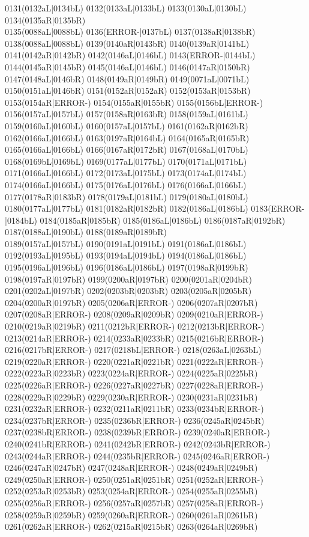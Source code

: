 0131(0132aL|0134bL) 0132(0133aL|0133bL) 0133(0130aL|0130bL) 0134(0135aR|0135bR) \\0135(0088aL|0088bL) 0136(ERROR-|0137bL) 0137(0138aR|0138bR) 0138(0088aL|0088bL) 0139(0140aR|0143bR) 0140(0139aR|0141bL) 0141(0142aR|0142bR) 0142(0146aL|0146bL) 0143(ERROR-|0144bL) \\0144(0145aR|0145bR) 0145(0146aL|0146bL) 0146(0147aR|0150bR) 0147(0148aL|0146bR) 0148(0149aR|0149bR) 0149(0071aL|0071bL) 0150(0151aL|0146bR) 0151(0152aR|0152aR) 0152(0153aR|0153bR) \\0153(0154aR|ERROR-) 0154(0155aR|0155bR) 0155(0156bL|ERROR-) 0156(0157aL|0157bL) 0157(0158aR|0163bR) 0158(0159aL|0161bL) 0159(0160aL|0160bL) 0160(0157aL|0157bL) 0161(0162aR|0162bR) \\0162(0166aL|0166bL) 0163(0197aR|0164bL) 0164(0165aR|0165bR) 0165(0166aL|0166bL) 0166(0167aR|0172bR) 0167(0168aL|0170bL) 0168(0169bL|0169bL) 0169(0177aL|0177bL) 0170(0171aL|0171bL) \\0171(0166aL|0166bL) 0172(0173aL|0175bL) 0173(0174aL|0174bL) 0174(0166aL|0166bL) 0175(0176aL|0176bL) 0176(0166aL|0166bL) 0177(0178aR|0183bR) 0178(0179aL|0181bL) 0179(0180aL|0180bL) \\0180(0177aL|0177bL) 0181(0182aR|0182bR) 0182(0186aL|0186bL) 0183(ERROR-|0184bL) 0184(0185aR|0185bR) 0185(0186aL|0186bL) 0186(0187aR|0192bR) 0187(0188aL|0190bL) 0188(0189aR|0189bR) \\0189(0157aL|0157bL) 0190(0191aL|0191bL) 0191(0186aL|0186bL) 0192(0193aL|0195bL) 0193(0194aL|0194bL) 0194(0186aL|0186bL) 0195(0196aL|0196bL) 0196(0186aL|0186bL) 0197(0198aR|0199bR) \\0198(0197aR|0197bR) 0199(0200aR|0197bR) 0200(0201aR|0204bR) 0201(0202aL|0197bR) 0202(0203bR|0203bR) 0203(0205aR|0205bR) 0204(0200aR|0197bR) 0205(0206aR|ERROR-) 0206(0207aR|0207bR) \\0207(0208aR|ERROR-) 0208(0209aR|0209bR) 0209(0210aR|ERROR-) 0210(0219aR|0219bR) 0211(0212bR|ERROR-) 0212(0213bR|ERROR-) 0213(0214aR|ERROR-) 0214(0233aR|0233bR) 0215(0216bR|ERROR-) \\0216(0217bR|ERROR-) 0217(0218bL|ERROR-) 0218(0263aL|0263bL) 0219(0220aR|ERROR-) 0220(0221aR|0221bR) 0221(0222aR|ERROR-) 0222(0223aR|0223bR) 0223(0224aR|ERROR-) 0224(0225aR|0225bR) \\0225(0226aR|ERROR-) 0226(0227aR|0227bR) 0227(0228aR|ERROR-) 0228(0229aR|0229bR) 0229(0230aR|ERROR-) 0230(0231aR|0231bR) 0231(0232aR|ERROR-) 0232(0211aR|0211bR) 0233(0234bR|ERROR-) \\0234(0237bR|ERROR-) 0235(0236bR|ERROR-) 0236(0245aR|0245bR) 0237(0238bR|ERROR-) 0238(0239bR|ERROR-) 0239(0240aR|ERROR-) 0240(0241bR|ERROR-) 0241(0242bR|ERROR-) 0242(0243bR|ERROR-) \\0243(0244aR|ERROR-) 0244(0235bR|ERROR-) 0245(0246aR|ERROR-) 0246(0247aR|0247bR) 0247(0248aR|ERROR-) 0248(0249aR|0249bR) 0249(0250aR|ERROR-) 0250(0251aR|0251bR) 0251(0252aR|ERROR-) \\0252(0253aR|0253bR) 0253(0254aR|ERROR-) 0254(0255aR|0255bR) 0255(0256aR|ERROR-) 0256(0257aR|0257bR) 0257(0258aR|ERROR-) 0258(0259aR|0259bR) 0259(0260aR|ERROR-) 0260(0261aR|0261bR) \\0261(0262aR|ERROR-) 0262(0215aR|0215bR) 0263(0264aR|0269bR) 
